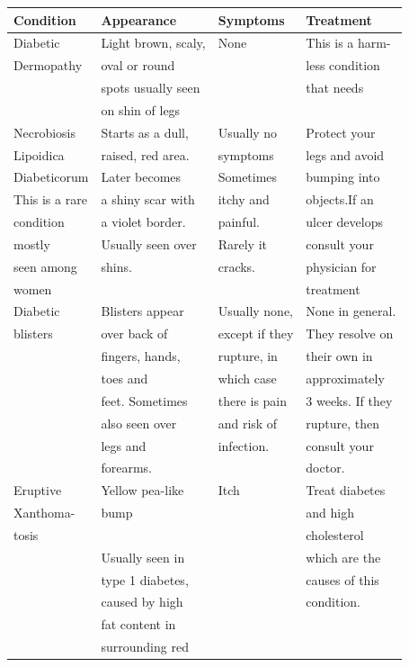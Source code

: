 \begin{longtable}{|l|l|l|l|}
\hline
\textbf{{Condition}} & \textbf{Appearance} & \textbf{Symptoms} & \textbf{Treatment}\\
\hline
Diabetic &  Light brown, scaly, & None & This is a harm-\\
Dermopathy & oval or round &  & less condition\\
 & spots usually seen &  & that needs\\
 & on shin of legs &  & \\
\hline
Necrobiosis & Starts as a dull, & Usually no & Protect your\\
Lipoidica & raised, red area. & symptoms & legs and avoid\\
Diabeticorum & Later becomes & Sometimes & bumping into\\
This is a rare & a shiny scar with & itchy and & objects.If an\\
condition & a violet border. & painful. & ulcer develops\\
mostly & Usually seen over & Rarely  it & consult your\\
seen among & shins. & cracks. & physician for\\
women &  &  & treatment\\
\hline
Diabetic & Blisters appear & Usually none, & None in general.\\
blisters & over back of & except if they & They resolve on\\
 & fingers, hands, & rupture, in & their own in\\
 & toes and & which case & approximately\\
 & feet. Sometimes & there is pain & 3 weeks. If they\\
 & also seen over & and risk of & rupture, then\\
 & legs and & infection. & consult your\\
 & forearms. &  & doctor.\\
\hline
Eruptive & Yellow pea-like & Itch & Treat diabetes\\
Xanthoma- & bump &  & and high\\
tosis  & & & cholesterol\\
\hline
 & Usually seen in &  & which are the\\
 & type 1 diabetes, &  & causes of this\\
 & caused by high &  & condition.\\
 & fat content in &  & \\
 & surrounding red &  & \\

\end{longtable}
